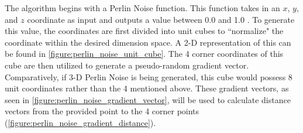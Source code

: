 \hfill

The algorithm begins with a Perlin Noise function. This function takes in an \(x\), \(y\), and \(z\) coordinate as input and outputs a value between 0.0 and 1.0 \cite{gustavson_2005}. To generate this value, the coordinates are first divided into unit cubes to ``normalize" the coordinate within the desired dimension space. A 2-D representation of this can be found in \autoref{figure:perlin_noise_unit_cube}. The 4 corner coordinates of this cube are then utilized to generate a pseudo-random gradient vector. Comparatively, if 3-D Perlin Noise is being generated, this cube would possess 8 unit coordinates rather than the 4 mentioned above. These gradient vectors, as seen in \autoref{figure:perlin_noise_gradient_vector}, will be used to calculate distance vectors from the provided point to the 4 corner points (\autoref{figure:perlin_noise_gradient_distance}).

\hfill

